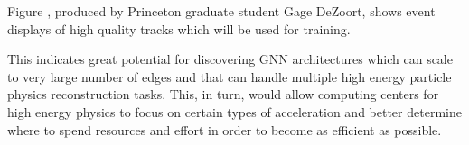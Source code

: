 \documentclass[preprint,12pt]{elsarticle}
\begin{document}
Figure %
, produced by Princeton graduate student Gage DeZoort, shows event displays of high quality
tracks which will be used for training.




This indicates great potential for discovering GNN architectures which can scale 
to very large number of edges and that can handle multiple high energy particle 
physics reconstruction tasks. This, in turn, would allow computing centers for 
high energy physics to focus on certain types of acceleration and better determine 
where to spend resources and effort in order to become as efficient as possible.
\end{document}
